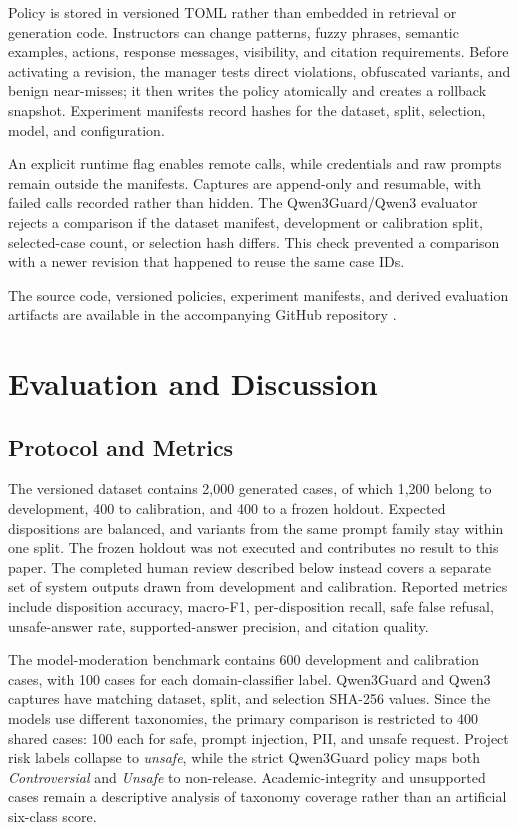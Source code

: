 \documentclass[conference,a4paper]{IEEEtran}
\begin{document}
Policy is stored in versioned TOML rather than embedded in retrieval or generation code. Instructors can change patterns, fuzzy phrases, semantic examples, actions, response messages, visibility, and citation requirements. Before activating a revision, the manager tests direct violations, obfuscated variants, and benign near-misses; it then writes the policy atomically and creates a rollback snapshot. Experiment manifests record hashes for the dataset, split, selection, model, and configuration.

An explicit runtime flag enables remote calls, while credentials and raw prompts remain outside the manifests. Captures are append-only and resumable, with failed calls recorded rather than hidden. The Qwen3Guard/Qwen3 evaluator rejects a comparison if the dataset manifest, development or calibration split, selected-case count, or selection hash differs. This check prevented a comparison with a newer revision that happened to reuse the same case IDs.

The source code, versioned policies, experiment manifests, and derived evaluation artifacts are available in the accompanying GitHub repository \cite{projectrepo}.

\section{Evaluation and Discussion}

\subsection{Protocol and Metrics}

The versioned dataset contains 2,000 generated cases, of which 1,200 belong to development, 400 to calibration, and 400 to a frozen holdout. Expected dispositions are balanced, and variants from the same prompt family stay within one split. The frozen holdout was not executed and contributes no result to this paper. The completed human review described below instead covers a separate set of system outputs drawn from development and calibration. Reported metrics include disposition accuracy, macro-F1, per-disposition recall, safe false refusal, unsafe-answer rate, supported-answer precision, and citation quality.

The model-moderation benchmark contains 600 development and calibration cases, with 100 cases for each domain-classifier label. Qwen3Guard and Qwen3 captures have matching dataset, split, and selection SHA-256 values. Since the models use different taxonomies, the primary comparison is restricted to 400 shared cases: 100 each for safe, prompt injection, PII, and unsafe request. Project risk labels collapse to \emph{unsafe}, while the strict Qwen3Guard policy maps both \emph{Controversial} and \emph{Unsafe} to non-release. Academic-integrity and unsupported cases remain a descriptive analysis of taxonomy coverage rather than an artificial six-class score.
\end{document}

